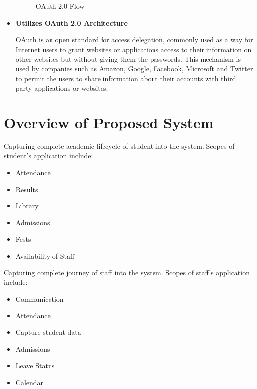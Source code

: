 \begin{itemize}
\begin{figure}[ht]
\caption{OAuth 2.0 Flow}
\end{figure}
\item \textbf{Utilizes OAuth 2.0 Architecture}\par
OAuth is an open standard for access delegation, commonly used as a way for Internet users to grant websites or applications access to their information on other websites but without giving them the passwords. This mechanism is used by companies such as Amazon, Google, Facebook, Microsoft and Twitter to permit the users to share information about their accounts with third party applications or websites.
\end{itemize}
\section{Overview of Proposed System}
Capturing complete academic lifecycle of student into the system. Scopes of student’s application include:
\begin{itemize}
\item Attendance
\item Results
\item Library
\item Admissions
\item Fests
\item Availability of Staff
\end{itemize}
\par
Capturing complete journey of staff into the system. Scopes of staff’s application include:
\begin{itemize}
\item Communication
\item Attendance
\item Capture student data
\item Admissions
\item Leave Status
\item Calendar
\end{itemize}